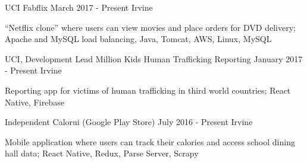 

\begin{cventries}
	
	\cventry
		{UCI} %
		{Fabflix}
		{March 2017 - Present} %
		{Irvine} %
		{
			\begin{cvitems} %
				\item “Netflix clone” where users can view movies and place orders for DVD delivery; Apache and MySQL load balancing, Java, Tomcat, AWS, Linux, MySQL
			\end{cvitems}
		}
	
  \cventry
	  {UCI, Development Lead} %
	  {Million Kids Human Trafficking Reporting}
	  {January 2017 - Present} %
	  {Irvine} %
	  {
	  	\begin{cvitems} %
	  		\item Reporting app for victims of human trafficking in third world countries; React Native, Firebase
	  	\end{cvitems}
	  }
	  
  \cventry
	  {Independent} %
	  {Calorui (Google Play Store)}
	  {July 2016 - Present} %
	  {Irvine} %
	  {
	  	\begin{cvitems} %
	  		\item Mobile application where users can track their calories and access school dining hall data; React Native, Redux, Parse Server, Scrapy
	  	\end{cvitems}
	  }

\end{cventries}
